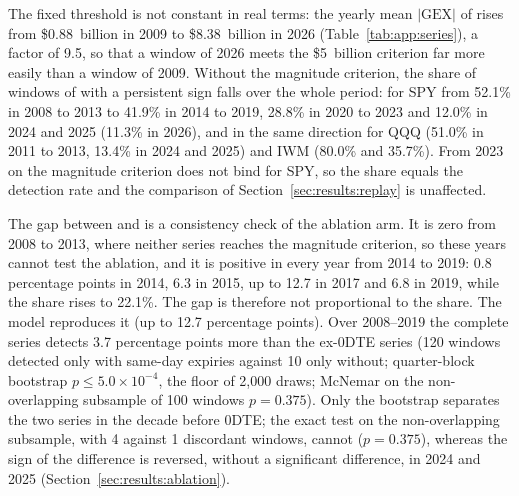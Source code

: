 The fixed threshold is not constant in real terms: the yearly mean $|\mathrm{GEX}|$ of  rises from \$0.88~billion in 2009 to \$8.38~billion in 2026 (Table~\ref{tab:app:series}), a factor of 9.5, so that a window of 2026 meets the \$5~billion criterion far more easily than a window of 2009. Without the magnitude criterion, the share of windows of  with a persistent sign falls over the whole period: for SPY from 52.1\% in 2008 to 2013 to 41.9\% in 2014 to 2019, 28.8\% in 2020 to 2023 and 12.0\% in 2024 and 2025 (11.3\% in 2026), and in the same direction for QQQ (51.0\% in 2011 to 2013, 13.4\% in 2024 and 2025) and IWM (80.0\% and 35.7\%). From 2023 on the magnitude criterion does not bind for SPY, so the share equals the detection rate and the comparison of Section~\ref{sec:results:replay} is unaffected.

The gap between  and  is a consistency check of the ablation arm. It is zero from 2008 to 2013, where neither series reaches the magnitude criterion, so these years cannot test the ablation, and it is positive in every year from 2014 to 2019: 0.8 percentage points in 2014, 6.3 in 2015, up to 12.7 in 2017 and 6.8 in 2019, while the share rises to 22.1\%. The gap is therefore not proportional to the share. The model reproduces it (up to 12.7 percentage points). Over 2008--2019 the complete series detects 3.7 percentage points more than the ex-0DTE series (120 windows detected only with same-day expiries against 10 only without; quarter-block bootstrap $p\le5.0\times10^{-4}$, the floor of 2{,}000 draws; McNemar on the non-overlapping subsample of 100 windows $p=0.375$). Only the bootstrap separates the two series in the decade before 0DTE; the exact test on the non-overlapping subsample, with 4 against 1 discordant windows, cannot ($p=0.375$), whereas the sign of the difference is reversed, without a significant difference, in 2024 and 2025 (Section~\ref{sec:results:ablation}).

